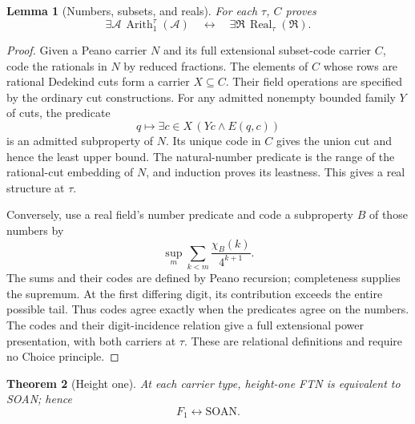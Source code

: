 \documentclass[11pt,letterpaper,numbers=noenddot]{scrartcl}
\numberwithin{equation}{section}
\newtheorem{theorem}{Theorem}[section]
\newtheorem{lemma}[theorem]{Lemma}
\theoremstyle{definition}
\newcommand{\Arith}{\operatorname{Arith}}
\newcommand{\Real}{\operatorname{Real}}
\newcommand{\SOAN}{\mathrm{SOAN}}
\begin{document}
\begin{lemma}[Numbers, subsets, and reals]\label{lem:codes}
For each $\tau$, $C$ proves
\begin{equation}\label{eq:exist-equiv}
\exists\mathcal A\,\Arith_1^\tau(\mathcal A)
\quad\longleftrightarrow\quad
\exists\mathfrak R\,\Real_\tau(\mathfrak R).
\end{equation}
\end{lemma}

\begin{proof}
Given a Peano carrier $N$ and its full extensional subset-code carrier $C$, code the rationals in $N$ by reduced fractions. The elements of $C$ whose rows are rational Dedekind cuts form a carrier $X\subseteq C$. Their field operations are specified by the ordinary cut constructions. For any admitted nonempty bounded family $Y$ of cuts, the predicate
\[
q\longmapsto\exists c\in X\,(Yc\land E(q,c))
\]
is an admitted subproperty of $N$. Its unique code in $C$ gives the union cut and hence the least upper bound. The natural-number predicate is the range of the rational-cut embedding of $N$, and induction proves its leastness. This gives a real structure at $\tau$.

Conversely, use a real field's number predicate and code a subproperty $B$ of those numbers by
\[
\sup_m\sum_{k<m}\frac{\chi_B(k)}{4^{k+1}}.
\]
The sums and their codes are defined by Peano recursion; completeness supplies the supremum. At the first differing digit, its contribution exceeds the entire possible tail. Thus codes agree exactly when the predicates agree on the numbers. The codes and their digit-incidence relation give a full extensional power presentation, with both carriers at $\tau$. These are relational definitions and require no Choice principle.
\end{proof}

\begin{theorem}[Height one]\label{thm:height-one}
At each carrier type, height-one FTN is equivalent to SOAN; hence
\begin{equation}\label{eq:f1}
\boxed{F_1\longleftrightarrow\SOAN.}
\end{equation}
\end{theorem}
\end{document}
